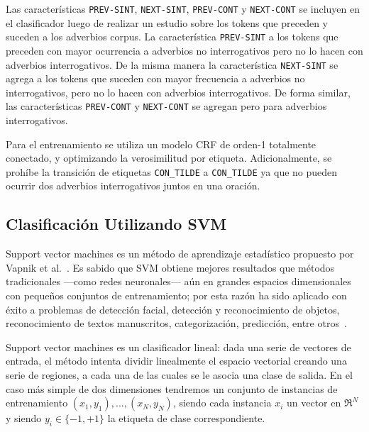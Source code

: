 \documentclass[runningheads,a4paper]{llncs}
\begin{document}
Las características \texttt{\small PREV-SINT}, \texttt{\small NEXT-SINT}, \texttt{\small PREV-CONT} y \texttt{\small NEXT-CONT} se incluyen en el clasificador luego de realizar un estudio sobre los tokens que preceden y suceden a los adverbios corpus. La característica \texttt{\small PREV-SINT} a los tokens que preceden con mayor ocurrencia a adverbios no interrogativos pero no lo hacen con adverbios interrogativos. De la misma manera la característica \texttt{\small NEXT-SINT} se agrega a los tokens que suceden con mayor frecuencia a adverbios no interrogativos, pero no lo hacen con adverbios interrogativos. %
De forma similar, las características \texttt{\small PREV-CONT} y \texttt{\small NEXT-CONT} se agregan pero para adverbios interrogativos.

Para el entrenamiento se utiliza un modelo CRF de orden-1 totalmente conectado, y optimizando la verosimilitud por etiqueta. Adicionalmente, se prohíbe la transición de etiquetas \texttt{\small CON\_TILDE} a \texttt{\small CON\_TILDE} ya que no pueden ocurrir dos adverbios interrogativos juntos en una oración. 

\subsection{Clasificación Utilizando SVM}
\label{sec:SVM}

Support vector machines es un método de aprendizaje estadístico propuesto por Vapnik et al.~\cite{CORTES95}. Es sabido que SVM obtiene mejores resultados que métodos tradicionales ---como redes neuronales--- aún en grandes espacios dimensionales con pequeños conjuntos de entrenamiento; por esta razón ha sido aplicado con éxito a problemas de detección facial, detección y reconocimiento de objetos, reconocimiento de textos manuscritos, categorización, predicción, entre otros~\cite{BYUN02}. 

Support vector machines es un clasificador lineal: dada una serie de vectores de entrada, el m\'etodo intenta dividir linealmente el espacio vectorial creando una serie de regiones, a cada una de las cuales se le asocia una clase de salida. En el caso más simple de dos dimensiones tendremos un conjunto de instancias de entrenamiento ${(x_1, y_1),...,(x_N,y_N)}$, siendo cada instancia $x_i$ un vector en $\Re^N$ y siendo $y_i \in \lbrace-1,+1\rbrace$ la etiqueta de clase correspondiente. 
\end{document}
